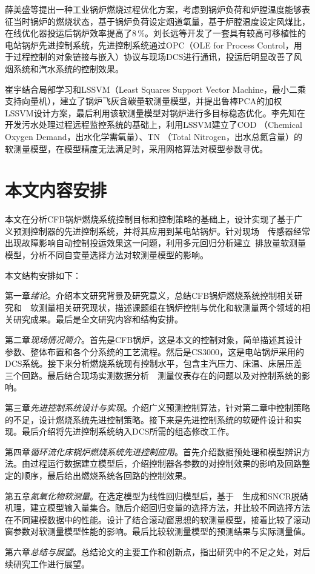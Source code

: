 薛美盛等提出一种工业锅炉燃烧过程优化方案，考虑到锅炉负荷和炉膛温度能够表征当时锅炉的燃烧状态，基于锅炉负荷设定烟道氧量，基于炉膛温度设定风煤比，在线优化器投运后锅炉效率提高了8$\,$\si{\percent}\cite{薛美盛2001工业锅炉在线燃烧优化}。刘长远等开发了一套具有较高可移植性的电站锅炉先进控制系统，先进控制系统通过OPC（OLE for Process Control，用于过程控制的对象链接与嵌入）协议与现场DCS进行通讯，投运后明显改善了风烟系统和汽水系统的控制效果\cite{刘长远2012电站锅炉先进控制系统的开发与应用}。

崔宇结合局部学习和LSSVM（Least Squares Support Vector Machine，最小二乘支持向量机），建立了锅炉飞灰含碳量软测量模型，并提出鲁棒PCA的加权LSSVM设计方案，最后利用该软测量模型对锅炉进行多目标稳态优化\cite{崔宇2009局部}。李先知在开发污水处理过程远程监控系统的基础上，利用LSSVM建立了COD （Chemical Oxygen Demand，出水化学需氧量）、TN （Total Nitrogen，出水总氮含量）的软测量模型，在模型精度无法满足时，采用网格算法对模型参数寻优\cite{李先知2016污水处理过程远程监控系统设计与支持向量机技术应用研究}。

\section{本文内容安排}

本文在分析CFB锅炉燃烧系统控制目标和控制策略的基础上，设计实现了基于广义预测控制器的先进控制系统，并将其应用到某电站锅炉。针对现场~~传感器经常出现故障影响自动控制投运效果这一问题，利用多元回归分析建立~排放量软测量模型，分析不同自变量选择方法对软测量模型的影响。


本文结构安排如下：

第一章\emph{绪论}。介绍本文研究背景及研究意义，总结CFB锅炉燃烧系统控制相关研究和~~软测量相关研究现状，描述课题组在锅炉控制与优化和软测量两个领域的相关研究成果。最后是全文研究内容和结构安排。

第二章\emph{现场情况简介}。首先是CFB锅炉，这是本文的控制对象，简单描述其设计参数、整体布置和各个分系统的工艺流程。然后是CS3000，这是电站锅炉采用的DCS系统。接下来分析燃烧系统现有控制水平，包含主汽压力、床温、床层压差三个回路。最后结合现场实测数据分析~~测量仪表存在的问题以及对控制系统的影响。

第三章\emph{先进控制系统设计与实现}。介绍广义预测控制算法，针对第二章中控制策略的不足，设计燃烧系统先进控制策略。接下来是先进控制系统的软硬件设计和实现。最后介绍将先进控制系统纳入DCS所需的组态修改工作。

第四章\emph{循环流化床锅炉燃烧系统先进控制应用}。首先介绍数据预处理和模型辨识方法。由过程运行数据建立模型后，介绍控制器各参数的对控制效果的影响及回路整定的顺序，最后给出燃烧系统各回路的控制效果。

第五章\emph{氮氧化物软测量}。在选定模型为线性回归模型后，基于~~生成和SNCR脱硝机理，建立模型输入量集合。随后介绍回归变量的选择方法，并比较不同选择方法在不同建模数据中的性能。设计了结合滚动窗思想的软测量模型，接着比较了滚动窗参数对软测量模型性能的影响。最后比较软测量模型的预测结果与实际测量值。

第六章\emph{总结与展望}。总结论文的主要工作和创新点，指出研究中的不足之处，对后续研究工作进行展望。

